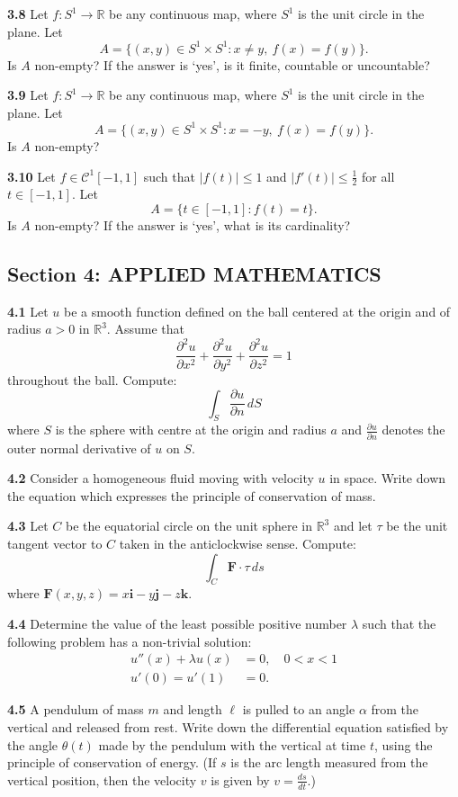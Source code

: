 \documentclass[11pt,a4paper]{article}
\newcommand{\R}{\mathbb{R}}
\newcommand{\examsec}[1]{%
  \subsection*{#1}
  \vspace{-2pt}
}
\newcommand{\qitem}[1]{\par\medskip\noindent\textbf{#1}\hspace{0.5em}}
\begin{document}
\qitem{3.8} Let $f : S^1 \to \R$ be any continuous map, where $S^1$ is the unit circle in the plane. Let
\[
  A = \{(x, y) \in S^1 \times S^1 : x \neq y,\ f(x) = f(y)\}.
\]
Is $A$ non-empty? If the answer is `yes', is it finite, countable or uncountable?

\qitem{3.9} Let $f : S^1 \to \R$ be any continuous map, where $S^1$ is the unit circle in the plane. Let
\[
  A = \{(x, y) \in S^1 \times S^1 : x = -y,\ f(x) = f(y)\}.
\]
Is $A$ non-empty?

\qitem{3.10} Let $f \in \mathcal{C}^1[-1, 1]$ such that $|f(t)| \le 1$ and $|f'(t)| \le \frac{1}{2}$ for all $t \in [-1, 1]$. Let
\[
  A = \{t \in [-1, 1] : f(t) = t\}.
\]
Is $A$ non-empty? If the answer is `yes', what is its cardinality?

\examsec{Section 4: APPLIED MATHEMATICS}

\qitem{4.1} Let $u$ be a smooth function defined on the ball centered at the origin and of radius $a > 0$ in $\R^3$. Assume that
\[
  \frac{\partial^2 u}{\partial x^2} + \frac{\partial^2 u}{\partial y^2} + \frac{\partial^2 u}{\partial z^2} = 1
\]
throughout the ball. Compute:
\[
  \int_S \frac{\partial u}{\partial n}\,dS
\]
where $S$ is the sphere with centre at the origin and radius $a$ and $\frac{\partial u}{\partial n}$ denotes the outer normal derivative of $u$ on $S$.

\qitem{4.2} Consider a homogeneous fluid moving with velocity $u$ in space. Write down the equation which expresses the principle of conservation of mass.

\qitem{4.3} Let $C$ be the equatorial circle on the unit sphere in $\R^3$ and let $\tau$ be the unit tangent vector to $C$ taken in the anticlockwise sense. Compute:
\[
  \int_C \mathbf{F} \cdot \tau\,ds
\]
where $\mathbf{F}(x, y, z) = x\mathbf{i} - y\mathbf{j} - z\mathbf{k}$.

\qitem{4.4} Determine the value of the least possible positive number $\lambda$ such that the following problem has a non-trivial solution:
\begin{align*}
  u''(x) + \lambda u(x) &= 0, \quad 0 < x < 1 \\
  u'(0) = u'(1) &= 0.
\end{align*}

\qitem{4.5} A pendulum of mass $m$ and length $\ell$ is pulled to an angle $\alpha$ from the vertical and released from rest. Write down the differential equation satisfied by the angle $\theta(t)$ made by the pendulum with the vertical at time $t$, using the principle of conservation of energy. (If $s$ is the arc length measured from the vertical position, then the velocity $v$ is given by $v = \frac{ds}{dt}$.)
\end{document}
